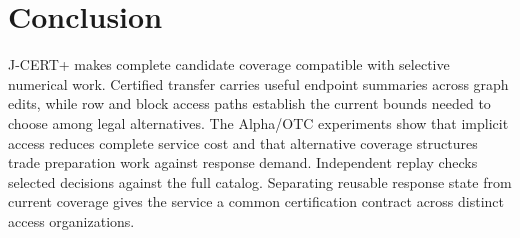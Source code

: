 \section{Conclusion}
\label{sec:conclusion}
J-CERT+ makes complete candidate coverage compatible with selective numerical work. Certified transfer carries useful endpoint summaries across graph edits, while row and block access paths establish the current bounds needed to choose among legal alternatives. The Alpha/OTC experiments show that implicit access reduces complete service cost and that alternative coverage structures trade preparation work against response demand. Independent replay checks selected decisions against the full catalog. Separating reusable response state from current coverage gives the service a common certification contract across distinct access organizations.
